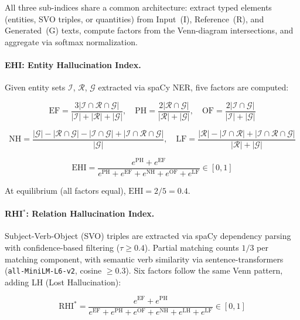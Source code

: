 \documentclass[11pt]{article}
\newcommand{\EHI}{\text{EHI}}
\newcommand{\RHI}{\text{RHI}^*}
\begin{document}
All three sub-indices share a common architecture: extract typed elements (entities, SVO triples, or quantities) from Input~(I), Reference~(R), and Generated~(G) texts, compute factors from the Venn-diagram intersections, and aggregate via softmax normalization.

\paragraph{EHI: Entity Hallucination Index.} Given entity sets $\mathcal{I}$, $\mathcal{R}$, $\mathcal{G}$ extracted via spaCy NER, five factors are computed:

\begin{equation}
\text{EF} = \frac{3|\mathcal{I} \cap \mathcal{R} \cap \mathcal{G}|}{|\mathcal{I}|+|\mathcal{R}|+|\mathcal{G}|}, \quad
\text{PH} = \frac{2|\mathcal{R} \cap \mathcal{G}|}{|\mathcal{R}|+|\mathcal{G}|}, \quad
\text{OF} = \frac{2|\mathcal{I} \cap \mathcal{G}|}{|\mathcal{I}|+|\mathcal{G}|}
\end{equation}

\begin{equation}
\text{NH} = \frac{|\mathcal{G}| - |\mathcal{R} \cap \mathcal{G}| - |\mathcal{I} \cap \mathcal{G}| + |\mathcal{I} \cap \mathcal{R} \cap \mathcal{G}|}{|\mathcal{G}|}, \quad
\text{LF} = \frac{|\mathcal{R}| - |\mathcal{I} \cap \mathcal{R}| + |\mathcal{I} \cap \mathcal{R} \cap \mathcal{G}|}{|\mathcal{R}|+|\mathcal{G}|}
\end{equation}

\begin{equation}
\EHI = \frac{e^{\text{PH}} + e^{\text{EF}}}{e^{\text{PH}} + e^{\text{EF}} + e^{\text{NH}} + e^{\text{OF}} + e^{\text{LF}}} \in [0, 1]
\label{eq:ehi}
\end{equation}

At equilibrium (all factors equal), $\EHI = 2/5 = 0.4$.

\paragraph{RHI$^*$: Relation Hallucination Index.} Subject-Verb-Object (SVO) triples are extracted via spaCy dependency parsing with confidence-based filtering ($\tau \geq 0.4$). Partial matching counts $1/3$ per matching component, with semantic verb similarity via sentence-transformers (\texttt{all-MiniLM-L6-v2}, cosine $\geq 0.3$). Six factors follow the same Venn pattern, adding LH (Lost Hallucination):

\begin{equation}
\RHI = \frac{e^{\text{EF}} + e^{\text{PH}}}{e^{\text{EF}} + e^{\text{PH}} + e^{\text{OF}} + e^{\text{NH}} + e^{\text{LH}} + e^{\text{LF}}} \in [0, 1]
\label{eq:rhi}
\end{equation}
\end{document}

